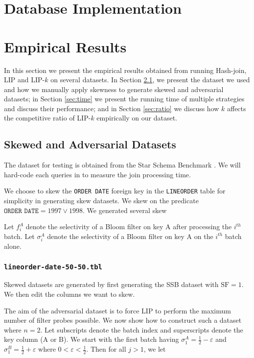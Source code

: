\section{Database Implementation}

   \section{Empirical Results}\label{sec:experiment}

In this section we present the empirical results obtained from running Hash-join, LIP and LIP-$k$ on several datasets. In Section \ref{sec:dataset}, we present the dataset we used and how we manually apply skewness to generate skewed and adversarial datasets; in Section \ref{sec:time} we present the running time of multiple strategies and discuss their performance; and in Section \ref{sec:ratio} we discuss how $k$ affects the competitive ratio of LIP-$k$ empirically on our dataset.



\subsection{Skewed and Adversarial Datasets}
\label{sec:dataset}
The dataset for testing is obtained from the Star Schema Benchmark \cite{o2009star}. We will hard-code each queries in \cite{o2009star} to measure the join processing time.

We choose to skew the \texttt{ORDER DATE} foreign key in the \texttt{LINEORDER} table for simplicity in generating skew datasets. We skew on the predicate $\texttt{ORDER DATE} = 1997 \vee 1998$.
We generated several skew

Let $f_i^A$ denote the selectivity of a Bloom filter on key A after processing the $i^{th}$ batch. 
Let $\sigma_i^A$ denote the selectivity of a Bloom filter on key A on the $i^{th}$ batch alone. 

\subsubsection{\texttt{lineorder-date-50-50.tbl}}

Skewed datasets are generated by first generating the SSB dataset with $\text{SF} = 1$.
We then edit the columns we want to skew. 

The aim of the adversarial dataset is to force LIP to perform the maximum number of filter probes possible.
We now show how to construct such a dataset where $n = 2$.
Let subscripts denote the batch index and superscripts denote the key column (A or B).
We start with the first batch having
$\sigma_1^A = \frac{1}{2} - \varepsilon$ and $\sigma_1^B = \frac{1}{2} + \varepsilon$ where $0 < \varepsilon < \frac{1}{2}$. Then for all $j > 1$, we let

